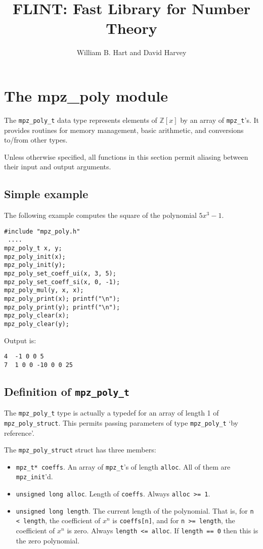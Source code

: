 \documentclass[a4paper,10pt]{article}
\title{FLINT: Fast Library for Number Theory}
\author{William B. Hart and David Harvey}
\newcommand{\Z}{\mathbb{Z}}
\newcommand{\code}{\lstinline}
\begin{document}
\maketitle
\lstset{language=c}
\lstset{basicstyle=\ttfamily}
\lstset{keywordstyle=}
\lstset{escapeinside=\%\%}

\section{The mpz\_poly module}

The \code{mpz_poly_t} data type represents elements of $\Z[x]$ by an array of \code{mpz_t}'s. It provides routines for memory management, basic arithmetic, and conversions to/from other types.

Unless otherwise specified, all functions in this section permit aliasing between their input and output arguments.

\subsection{Simple example}

The following example computes the square of the polynomial $5x^3 - 1$.

\begin{lstlisting}
#include "mpz_poly.h"
 ....
mpz_poly_t x, y;
mpz_poly_init(x);
mpz_poly_init(y);
mpz_poly_set_coeff_ui(x, 3, 5);
mpz_poly_set_coeff_si(x, 0, -1);
mpz_poly_mul(y, x, x);
mpz_poly_print(x); printf("\n");
mpz_poly_print(y); printf("\n");
mpz_poly_clear(x);
mpz_poly_clear(y);
\end{lstlisting}

Output is:

\begin{lstlisting}
4  -1 0 0 5
7  1 0 0 -10 0 0 25
\end{lstlisting}

\subsection{Definition of \code{mpz_poly_t}}

The \code{mpz_poly_t} type is actually a typedef for an array of length 1 of \code{mpz_poly_struct}. This permits passing parameters  of type \code{mpz_poly_t} `by reference'.

The \code{mpz_poly_struct} struct has three members:
\begin{itemize}
\item \code{mpz_t* coeffs}. An array of \code{mpz_t}'s of length \code{alloc}. All of them are \code{mpz_init}'d.
\item \code{unsigned long alloc}. Length of \code{coeffs}. Always \code{alloc >= 1}.
\item \code{unsigned long length}. The current length of the polynomial. That is, for \code{n < length}, the coefficient of $x^n$ is \code{coeffs[n]}, and for \code{n >= length}, the coefficient of $x^n$ is zero. Always \code{length <= alloc}. If \code{length == 0} then this is the zero polynomial. 
\end{itemize}
\end{document}
